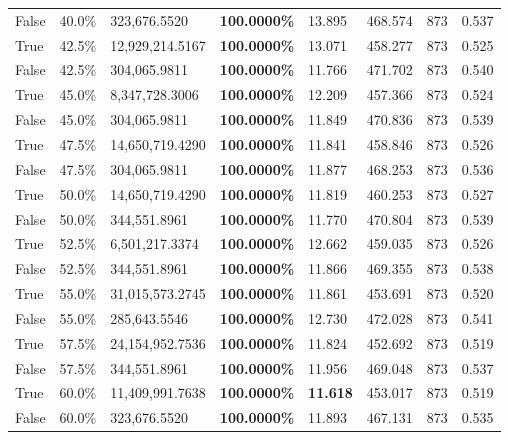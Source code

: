 \begin{table}[H]
{\begin{tabular}{lllrllll}
\cline{1-8}
False & 40.0\% & 323,676.5520 & \bfseries \color{red} 100.0000\% & 13.895 & 468.574 & 873 & 0.537 \\
\cline{1-8}
True & 42.5\% & 12,929,214.5167 & \bfseries \color{red} 100.0000\% & 13.071 & 458.277 & 873 & 0.525 \\
\cline{1-8}
False & 42.5\% & 304,065.9811 & \bfseries \color{red} 100.0000\% & 11.766 & 471.702 & 873 & 0.540 \\
\cline{1-8}
True & 45.0\% & 8,347,728.3006 & \bfseries \color{red} 100.0000\% & 12.209 & 457.366 & 873 & 0.524 \\
\cline{1-8}
False & 45.0\% & 304,065.9811 & \bfseries \color{red} 100.0000\% & 11.849 & 470.836 & 873 & 0.539 \\
\cline{1-8}
True & 47.5\% & 14,650,719.4290 & \bfseries \color{red} 100.0000\% & 11.841 & 458.846 & 873 & 0.526 \\
\cline{1-8}
False & 47.5\% & 304,065.9811 & \bfseries \color{red} 100.0000\% & 11.877 & 468.253 & 873 & 0.536 \\
\cline{1-8}
True & 50.0\% & 14,650,719.4290 & \bfseries \color{red} 100.0000\% & 11.819 & 460.253 & 873 & 0.527 \\
\cline{1-8}
False & 50.0\% & 344,551.8961 & \bfseries \color{red} 100.0000\% & 11.770 & 470.804 & 873 & 0.539 \\
\cline{1-8}
True & 52.5\% & 6,501,217.3374 & \bfseries \color{red} 100.0000\% & 12.662 & 459.035 & 873 & 0.526 \\
\cline{1-8}
False & 52.5\% & 344,551.8961 & \bfseries \color{red} 100.0000\% & 11.866 & 469.355 & 873 & 0.538 \\
\cline{1-8}
True & 55.0\% & 31,015,573.2745 & \bfseries \color{red} 100.0000\% & 11.861 & 453.691 & 873 & 0.520 \\
\cline{1-8}
False & 55.0\% & 285,643.5546 & \bfseries \color{red} 100.0000\% & 12.730 & 472.028 & 873 & 0.541 \\
\cline{1-8}
True & 57.5\% & 24,154,952.7536 & \bfseries \color{red} 100.0000\% & 11.824 & 452.692 & 873 & 0.519 \\
\cline{1-8}
False & 57.5\% & 344,551.8961 & \bfseries \color{red} 100.0000\% & 11.956 & 469.048 & 873 & 0.537 \\
\cline{1-8}
True & 60.0\% & 11,409,991.7638 & \bfseries \color{red} 100.0000\% & \bfseries \color{red} 11.618 & 453.017 & 873 & 0.519 \\
\cline{1-8}
False & 60.0\% & 323,676.5520 & \bfseries \color{red} 100.0000\% & 11.893 & 467.131 & 873 & 0.535 \\

\end{tabular}}
\end{table}
